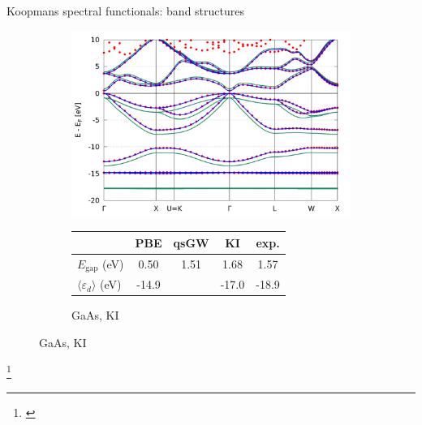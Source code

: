 \documentclass[xcolor=table,aspectratio=169]{beamer}
\newcommand\blfootcite[1]{%
  \begingroup
  \renewcommand\thefootnote{}\footnote{\hspace{-4ex}\cite{#1}}%
  \addtocounter{footnote}{-1}%
  \endgroup
}
\numberwithin{equation}{section}
\begin{document}
\begin{frame}{\normalsize Koopmans spectral functionals: band structures}
\begin{figure}[t]
\begin{subfigure}{0.45\textwidth}
         \includegraphics[width=\columnwidth]{figures/GaAs_ki_bands.png}
         \caption{GaAs, KI}
         \footnotesize
         \begin{tabularx}{\columnwidth}{l C C C C}
                                                 & PBE   & qsGW & KI    & exp.  \\
            \hline
            $E_\mathrm{gap}$ (eV)                & 0.50  & 1.51 & 1.68  & 1.57  \\
            $\langle \varepsilon_d \rangle$ (eV) & -14.9 &      & -17.0 & -18.9
         \end{tabularx}
      \end{subfigure}
   \end{figure}
   \blfootcite{DeGennaro2021}
\end{frame}
\end{document}
